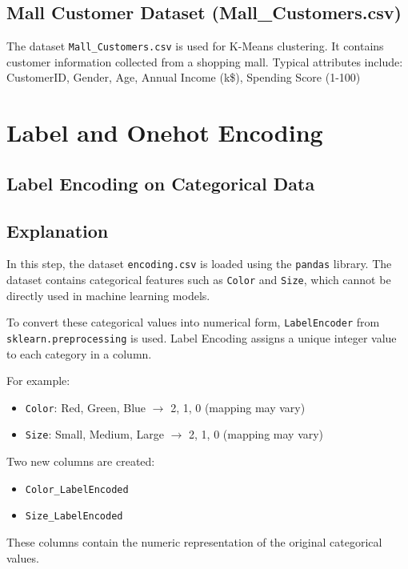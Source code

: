 \documentclass[11pt,a4paper]{report}
\begin{document}
\subsection*{Mall Customer Dataset (Mall\_Customers.csv)}
The dataset \texttt{Mall\_Customers.csv} is used for K-Means clustering. It contains customer information collected from a shopping mall. Typical attributes include:
CustomerID, Gender, Age, Annual Income (k\$), Spending Score (1-100)


\section{Label and Onehot Encoding}

\subsection{Label Encoding on Categorical Data}

\subsection*{Explanation}
In this step, the dataset \texttt{encoding.csv} is loaded using the \texttt{pandas} library. The dataset contains categorical features such as \texttt{Color} and \texttt{Size}, which cannot be directly used in machine learning models.

To convert these categorical values into numerical form, \texttt{LabelEncoder} from \texttt{sklearn.preprocessing} is used. Label Encoding assigns a unique integer value to each category in a column.

For example:
\begin{itemize}
    \item \texttt{Color}: Red, Green, Blue $\rightarrow$ 2, 1, 0 (mapping may vary)
    \item \texttt{Size}: Small, Medium, Large $\rightarrow$ 2, 1, 0 (mapping may vary)
\end{itemize}

Two new columns are created:
\begin{itemize}
    \item \texttt{Color\_LabelEncoded}
    \item \texttt{Size\_LabelEncoded}
\end{itemize}

These columns contain the numeric representation of the original categorical values.
\end{document}
